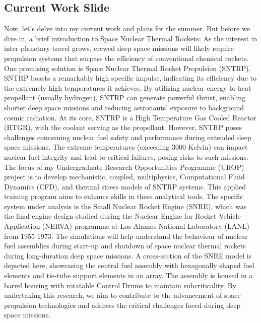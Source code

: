 \documentclass[8pt,a5paper]{article}
\begin{document}
\subsection*{Current Work Slide}

Now, let's delve into my current work and plans for the summer. But before we dive in, a brief introduction to Space Nuclear Thermal Rockets:
As the interest in inter-planetary travel grows, crewed deep space missions will likely require propulsion systems that surpass the efficiency of conventional chemical rockets. One promising solution is Space Nuclear Thermal Rocket Propulsion (SNTRP). SNTRP boasts a remarkably high specific impulse, indicating its efficiency due to the extremely high temperatures it achieves. By utilizing nuclear energy to heat propellant (usually hydrogen), SNTRP can generate powerful thrust, enabling shorter deep space missions and reducing astronauts' exposure to background cosmic radiation. At its core, SNTRP is a High Temperature Gas Cooled Reactor (HTGR), with the coolant serving as the propellant. However, SNTRP poses challenges concerning nuclear fuel safety and performance during extended deep space missions. The extreme temperatures (exceeding 3000 Kelvin) can impact nuclear fuel integrity and lead to critical failures, posing risks to such missions.\\

The focus of my Undergraduate Research Opportunities Programme (UROP) project is to develop mechanistic, coupled, multiphysics, Computational Fluid Dynamics (CFD), and thermal stress models of SNTRP systems. This applied training program aims to enhance skills in these analytical tools. The specific system under analysis is the Small Nuclear Rocket Engine (SNRE), which was the final engine design studied during the Nuclear Engine for Rocket Vehicle Application (NERVA) programme at Los Alamos National Laboratory (LANL) from 1955-1973. The simulations will help understand the behaviour of nuclear fuel assemblies during start-up and shutdown of space nuclear thermal rockets during long-duration deep space missions. A cross-section of the SNRE model is depicted here, showcasing the central fuel assembly with hexagonally shaped fuel elements and tie-tube support elements in an array. The assembly is housed in a barrel housing with rotatable Control Drums to maintain subcriticality. By undertaking this research, we aim to contribute to the advancement of space propulsion technologies and address the critical challenges faced during deep space missions.\\
\end{document}
